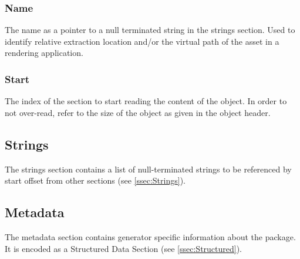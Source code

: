 {	\subsubsection{Name}
	The name as a pointer to a null terminated string in the strings section. Used to identify relative extraction location and/or the virtual path of the asset in a rendering application.

	\subsubsection{Start}
	The index of the section to start reading the content of the object. In order to not over-read, refer to the size of the object as given in the object header.
}

\subsection{Strings}
The strings section contains a list of null-terminated strings to be referenced by start offset from other sections (see \ref{ssec:Strings}).

\subsection{Metadata}
The metadata section contains generator specific information about the package. It is encoded as a Structured Data Section (see \ref{ssec:Structured}).
